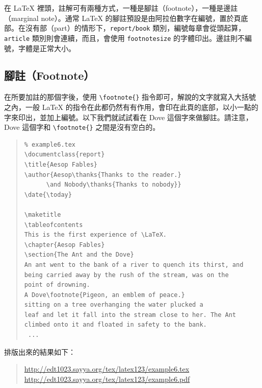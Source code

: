 在 \LaTeX{} 裡頭，註解可有兩種方式，一種是腳註（footnote），一種是邊註（marginal note）。通常 \LaTeX{} 的腳註預設是由阿拉伯數字在編號，置於頁底部。在沒有部（part）的情形下，\texttt{report/book} 類別，編號每章會從頭起算，\texttt{article} 類別則會連續，而且，會使用 \texttt{footnotesize} 的字體印出。邊註則不編號，字體是正常大小。

\subsection{腳註（Footnote）}

在所要加註的那個字後，使用 \verb|\footnote{}| 指令即可，解說的文字就寫入大括號之內，一般 \LaTeX{} 的指令在此都仍然有有作用，會印在此頁的底部，以小一點的字來印出，並加上編號。以下我們就試試看在 Dove 這個字來做腳註。請注意，Dove 這個字和 \verb|\footnote{}| 之間是沒有空白的。

\begin{quote}
   \begin{verbatim}
% example6.tex
\documentclass{report}
\title{Aesop Fables}
\author{Aesop\thanks{Thanks to the reader.}
      \and Nobody\thanks{Thanks to nobody}}
\date{\today}

\maketitle
\tableofcontents
This is the first experience of \LaTeX.
\chapter{Aesop Fables}
\section{The Ant and the Dove}
An ant went to the bank of a river to quench its thirst, and
being carried away by the rush of the stream, was on the
point of drowning.
A Dove\footnote{Pigeon, an emblem of peace.}
sitting on a tree overhanging the water plucked a
leaf and let it fall into the stream close to her. The Ant
climbed onto it and floated in safety to the bank.
 ...
\end{verbatim}
\end{quote}

排版出來的結果如下：

\begin{quote}
   \url{http://edt1023.sayya.org/tex/latex123/example6.tex}\\
   \url{http://edt1023.sayya.org/tex/latex123/example6.pdf}
\end{quote}

